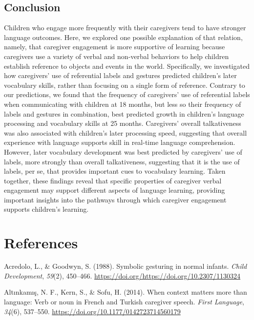 \documentclass[
  english,
  man,floatsintext]{apa6}
\begin{document}
\hypertarget{conclusion}{%
\subsection{Conclusion}\label{conclusion}}

Children who engage more frequently with their caregivers tend to have stronger language outcomes. Here, we explored one possible explanation of that relation, namely, that caregiver engagement is more supportive of learning because caregivers use a variety of verbal and non-verbal behaviors to help children establish reference to objects and events in the world. Specifically, we investigated how caregivers' use of referential labels and gestures predicted children's later vocabulary skills, rather than focusing on a single form of reference. Contrary to our predictions, we found that the frequency of caregivers' use of referential labels when communicating with children at 18 months, but less so their frequency of labels and gestures in combination, best predicted growth in children's language processing and vocabulary skills at 25 months. Caregivers' overall talkativeness was also associated with children's later processing speed, suggesting that overall experience with language supports skill in real-time language comprehension. However, later vocabulary development was best predicted by caregivers' use of labels, more strongly than overall talkativeness, suggesting that it is the use of labels, per se, that provides important cues to vocabulary learning. Taken together, these findings reveal that specific properties of caregiver verbal engagement may support different aspects of language learning, providing important insights into the pathways through which caregiver engagement supports children's learning.

\newpage

\hypertarget{references}{%
\section{References}\label{references}}

\hypertarget{refs}{}
\leavevmode\hypertarget{ref-acredolo_symbolic_1988}{}%
Acredolo, L., \& Goodwyn, S. (1988). Symbolic gesturing in normal infants. \emph{Child Development}, \emph{59}(2), 450--466. \url{https://doi.org/https://doi.org/10.2307/1130324}

\leavevmode\hypertarget{ref-altinkamis_when_2014}{}%
Altınkamış, N. F., Kern, S., \& Sofu, H. (2014). When context matters more than language: Verb or noun in French and Turkish caregiver speech. \emph{First Language}, \emph{34}(6), 537--550. \url{https://doi.org/10.1177/0142723714560179}
\end{document}
